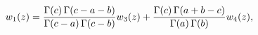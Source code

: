 \[w_{1}(z)=\frac{\mathop{\Gamma\/}\nolimits\!\left(c\right)\mathop{\Gamma\/}%
\nolimits\!\left(c-a-b\right)}{\mathop{\Gamma\/}\nolimits\!\left(c-a\right)%
\mathop{\Gamma\/}\nolimits\!\left(c-b\right)}w_{3}(z)+\frac{\mathop{\Gamma\/}%
\nolimits\!\left(c\right)\mathop{\Gamma\/}\nolimits\!\left(a+b-c\right)}{%
\mathop{\Gamma\/}\nolimits\!\left(a\right)\mathop{\Gamma\/}\nolimits\!\left(b%
\right)}w_{4}(z),\]